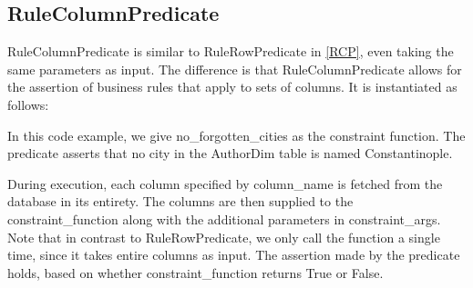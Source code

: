 \subsection{RuleColumnPredicate}
RuleColumnPredicate is similar to RuleRowPredicate in \cref{RCP}, even taking the same parameters as input. The difference is that RuleColumnPredicate allows for the assertion of business rules that apply to sets of columns. It is instantiated as follows:


In this code example, we give no\_forgotten\_cities as the constraint function. The predicate asserts that no city in the AuthorDim table is named Constantinople.

During execution, each column specified by column\_name is fetched from the database in its entirety. The columns are then supplied to the constraint\_function along with the additional parameters in constraint\_args. Note that in contrast to RuleRowPredicate, we only call the function a single time, since it takes entire columns as input. The assertion made by the predicate holds, based on whether constraint\_function returns True or False.

